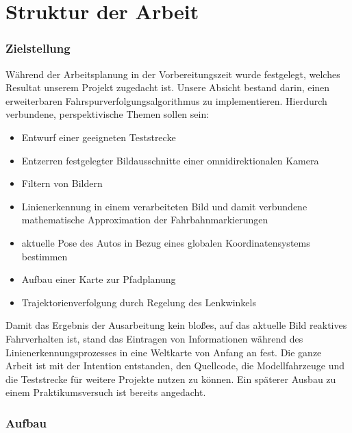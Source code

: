 \section{Struktur der Arbeit}

\subsubsection{Zielstellung}

Während der Arbeitsplanung in der Vorbereitungszeit wurde festgelegt, welches Resultat unserem Projekt zugedacht ist. Unsere Absicht bestand darin, einen erweiterbaren Fahrspurverfolgungsalgorithmus zu implementieren. Hierdurch verbundene, perspektivische Themen sollen sein:

\begin{itemize}
\item Entwurf einer geeigneten Teststrecke
\item Entzerren festgelegter Bildausschnitte einer omnidirektionalen Kamera
\item Filtern von Bildern
\item Linienerkennung in einem verarbeiteten Bild und damit verbundene mathematische Approximation der Fahrbahnmarkierungen
\item aktuelle Pose des Autos in Bezug eines globalen Koordinatensystems bestimmen
\item Aufbau einer Karte zur Pfadplanung
\item Trajektorienverfolgung durch Regelung des Lenkwinkels
\end{itemize}

Damit das Ergebnis der Ausarbeitung kein bloßes, auf das aktuelle Bild reaktives Fahrverhalten ist, stand das Eintragen von Informationen während des Linienerkennungsprozesses in eine Weltkarte von Anfang an fest. Die ganze Arbeit ist mit der Intention entstanden, den Quellcode, die Modellfahrzeuge und die Teststrecke für weitere Projekte nutzen zu können. Ein späterer Ausbau zu einem Praktikumsversuch ist bereits angedacht.

\subsubsection{Aufbau}

